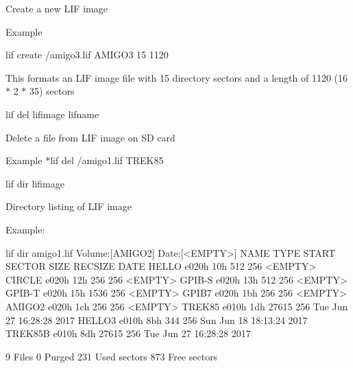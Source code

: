 \begin{DoxyItemize}
\begin{DoxyItemize}
\item Create a new L\+IF image
\item Example
\begin{DoxyItemize}
\item lif create /amigo3.lif A\+M\+I\+G\+O3 15 1120
\begin{DoxyItemize}
\item This formats an L\+IF image file with 15 directory sectors and a length of 1120 (16 $\ast$ 2 $\ast$ 35) sectors
\end{DoxyItemize}
\end{DoxyItemize}
\end{DoxyItemize}
\item lif del lifimage lifname
\begin{DoxyItemize}
\item Delete a file from L\+IF image on SD card
\item Example $\ast$lif del /amigo1.lif T\+R\+E\+K85
\end{DoxyItemize}
\item lif dir lifimage
\begin{DoxyItemize}
\item Directory listing of L\+IF image
\end{DoxyItemize}
\item Example\+: 
\begin{DoxyPre}
      lif dir amigo1.lif
      Volume:[AMIGO2] Date:[<EMPTY>]
      NAME         TYPE   START SECTOR        SIZE    RECSIZE   DATE
      HELLO       e020h            10h         512        256   <EMPTY>
      CIRCLE      e020h            12h         256        256   <EMPTY>
      GPIB-S      e020h            13h         512        256   <EMPTY>
      GPIB-T      e020h            15h        1536        256   <EMPTY>
      GPIB7       e020h            1bh         256        256   <EMPTY>
      AMIGO2      e020h            1ch         256        256   <EMPTY>
      TREK85      e010h            1dh       27615        256   Tue Jun 27 16:28:28 2017
      HELLO3      e010h            8bh         344        256   Sun Jun 18 18:13:24 2017
      TREK85B     e010h            8dh       27615        256   Tue Jun 27 16:28:28 2017\end{DoxyPre}



\begin{DoxyPre}             9 Files
             0 Purged
           231 Used sectors
           873 Free sectors
      \end{DoxyPre}


\end{DoxyItemize}
